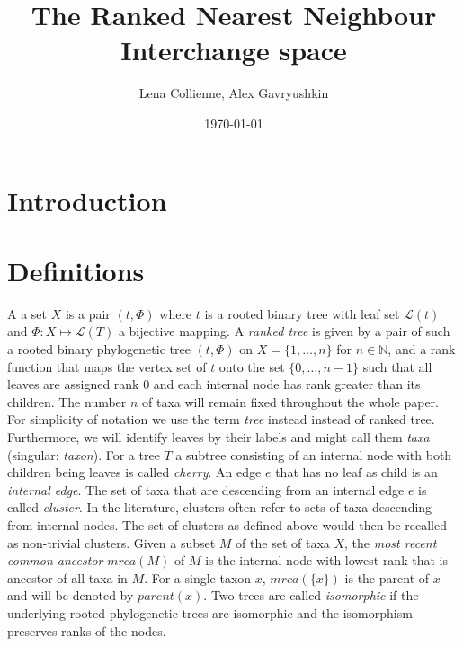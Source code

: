 \documentclass[11pt, a4paper]{article}
\title{The Ranked Nearest Neighbour Interchange space}
\date{\today}
\author{Lena Collienne, Alex Gavryushkin}
\begin{document}
\maketitle

\begin{abstract}

\end{abstract}


\section{Introduction}

\section{Definitions}


A  a set $X$ is a pair $(t, \Phi)$ where $t$ is a rooted binary tree with leaf set $\mathcal{L}(t)$ and $\Phi:X \mapsto \mathcal{L}(T)$ a bijective mapping. 
A \emph{ranked tree} is given by a pair of such a rooted binary phylogenetic tree $(t, \Phi)$ on $X = \{1, \ldots, n\}$ for $n \in \mathbb N$, and a rank function that maps the vertex set of $t$ onto the set $\{0,\ldots,n-1\}$ such that all leaves are assigned rank $0$ and each internal node has rank greater than its children.
The number $n$ of taxa will remain fixed throughout the whole paper.
For simplicity of notation we use the term \emph{tree} instead instead of ranked tree.
Furthermore, we will identify leaves by their labels and might call them \emph{taxa} (singular: \emph{taxon}).
For a tree $T$ a subtree consisting of an internal node with both children being leaves is called \emph{cherry}.
An edge $e$ that has no leaf as child is an \emph{internal edge}.
The set of taxa that are descending from an internal edge $e$ is called \emph{cluster}. 
In the literature, clusters often refer to sets of taxa descending from internal nodes.
The set of clusters as defined above would then be recalled as non-trivial clusters.
Given a subset $M$ of the set of taxa $X$, the \emph{most recent common ancestor} $mrca(M)$ of $M$ is the internal node with lowest rank that is ancestor of all taxa in $M$. 
For a single taxon $x$, $mrca(\{x\})$ is the parent of $x$ and will be denoted by $parent(x)$.
Two trees are called \emph{isomorphic} if the underlying rooted phylogenetic trees are isomorphic and the isomorphism preserves ranks of the nodes.
\end{document}
